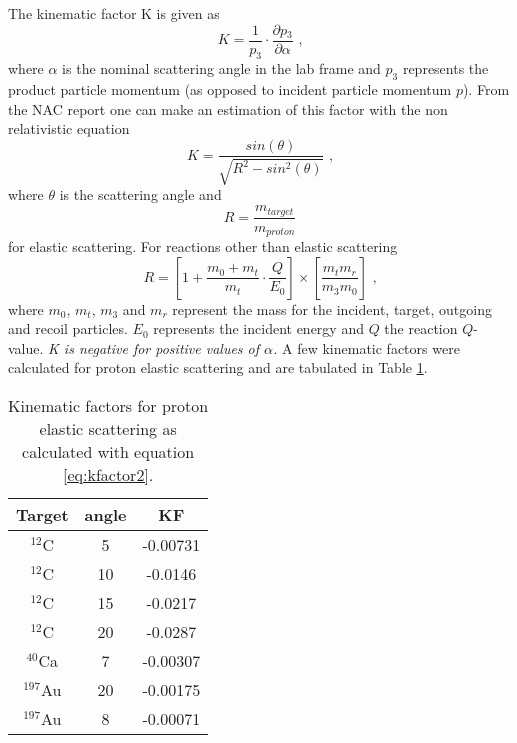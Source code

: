 \documentclass[11pt]{report}
\begin{document}
The kinematic factor K is given as 
\begin{equation} 
K=\frac{1}{p_3} \cdot \frac{\partial p{_3}}{\partial \alpha} \label{eq:kfactor} \textrm{      ,}
\end{equation} 
where $\alpha$ is the nominal scattering angle in the lab frame and $p_3$ represents the product  
particle momentum (as opposed to incident particle momentum $p$).
From the NAC report \cite{NAC92} %
one can make an estimation of this factor
with the non relativistic equation 
%
\begin{equation} 
K=\frac{sin(\theta)}{\sqrt{R^{2}-sin^2(\theta)}}      \label{eq:kfactor2} \textrm{      ,}
\end{equation} 
where $\theta$ is the scattering angle and
\begin{equation} 
R=\frac{m_{target}}{m_{proton}}
\end{equation} 
for elastic scattering. 
For reactions other than elastic scattering
\begin{equation} 
R=\left[ 1+\frac{m_{0} +m_{t}}{m_{t}}\cdot \frac{Q}{E_{0}}\right] \times [\frac{m_{t}m_{r}}{m_{3}m_{0}} ]   \label{eq:R} \textrm{      ,}
\end{equation} 
where $m_{0}$, $m_{t}$, $m_{3}$ and  $m_{r}$ represent the mass for
the incident, target, outgoing and recoil particles. $E_0$ represents the incident
energy and $Q$ the reaction $Q$-value.
{\it K is negative for positive values of $\alpha$. }
A few kinematic factors were calculated for proton elastic scattering 
and are tabulated in Table \ref{table:KF}.

\begin{table}[!ht]
\centering
\begin{tabular}{|c|c|c|}
\hline
Target & angle & KF\\ 
\hline
\hline
$^{12}$C &  5     &  -0.00731   \\
$^{12}$C &  10    &  -0.0146    \\
$^{12}$C &  15    &  -0.0217    \\
$^{12}$C &  20    &  -0.0287    \\
$^{40}$Ca &  7    &  -0.00307   \\
$^{197}$Au &  20  &  -0.00175   \\
$^{197}$Au &  8   &  -0.00071   \\
\hline
\end{tabular}
\caption{Kinematic factors for proton elastic scattering as calculated with equation \ref{eq:kfactor2}.}
\label{table:KF}
\end{table}
\end{document}
